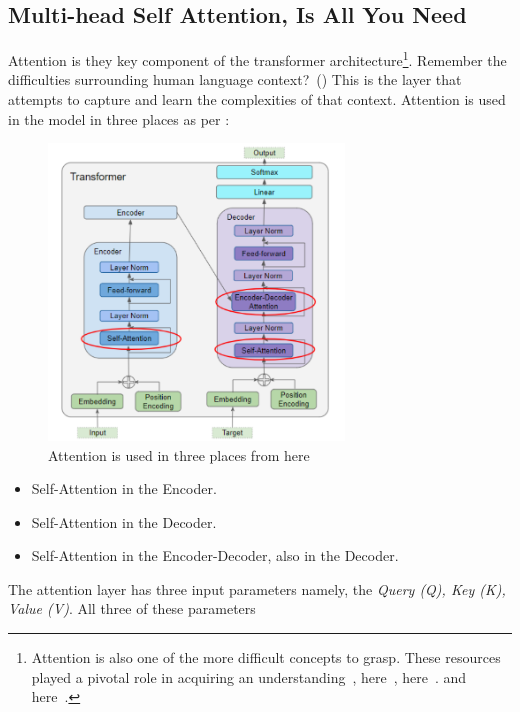 \subsection{Multi-head Self Attention, Is All You Need}
Attention is they key component of the transformer architecture\footnote{Attention is also one of the more difficult concepts to grasp. These resources
	played a pivotal role in acquiring an understanding~\autocite{doshiTransformersExplainedVisually2021b}, here~\autocite{doshiTransformersExplainedVisually2021a},
	here~\autocite{cristinaTransformerAttentionMechanism2021}.
	and here~\autocite{alammarIllustratedTransformer}.}.
Remember the difficulties surrounding human language context?~() This is the layer that attempts to capture and learn
the complexities of that context. Attention is used in the model in three places as per :
\begin{figure}[H]
	\centering
	\includegraphics[width=0.7\textwidth]{figures/attention_usage.png}
	\caption[Attention Usage]{Attention is used in three places from here~\autocite{doshiTransformersExplainedVisually2021a}}
	\label{fig:attention_usage}
\end{figure}
\begin{itemize}
	\item Self-Attention in the Encoder.
	\item Self-Attention in the Decoder.
	\item Self-Attention in the Encoder-Decoder, also in the Decoder.
\end{itemize}
The attention layer has three input parameters namely, the \emph{Query (Q), Key (K), Value (V)}. All three of these parameters
